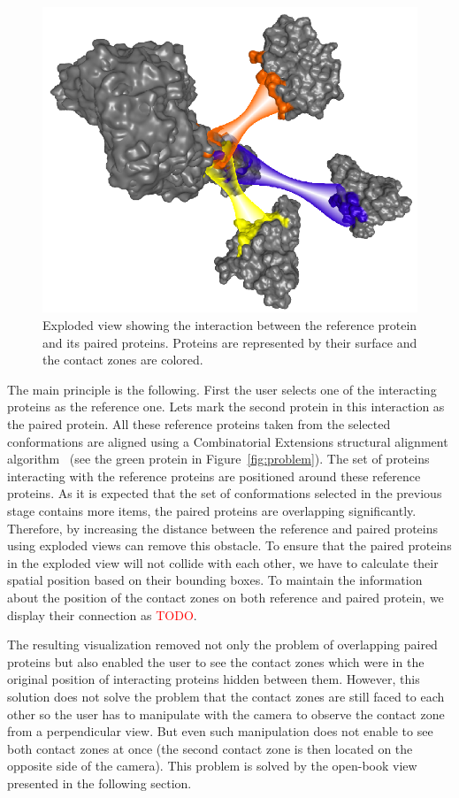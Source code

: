 \documentclass[journal]{vgtc}                %
\begin{document}
\begin{figure}[bt]
  \centering
  \includegraphics[width=1.0\columnwidth]{exploded.png}
  \caption{Exploded view showing the interaction between the reference protein and its paired proteins. Proteins are represented by their surface and the contact zones are colored.}
  \label{fig:exploded}
\end{figure}

The main principle is the following.
First the user selects one of the interacting proteins as the reference one.
Lets mark the second protein in this interaction as the paired protein.
All these reference proteins taken from the selected conformations are aligned using a Combinatorial Extensions structural alignment algorithm~\cite{Shindyalov1998} (see the green protein in Figure~\ref{fig:problem}).
The set of proteins interacting with the reference proteins are positioned around these reference proteins.
As it is expected that the set of conformations selected in the previous stage contains more items, the paired proteins are overlapping significantly.
Therefore, by increasing the distance between the reference and paired proteins using exploded views can remove this obstacle.
To ensure that the paired proteins in the exploded view will not collide with each other, we have to calculate their spatial position based on their bounding boxes.
To maintain the information about the position of the contact zones on both reference and paired protein, we display their connection as \textcolor{red}{TODO}.

The resulting visualization removed not only the problem of overlapping paired proteins but also enabled the user to see the contact zones which were in the original position of interacting proteins hidden between them.
However, this solution does not solve the problem that the contact zones are still faced to each other so the user has to manipulate with the camera to observe the contact zone from a perpendicular view. 
But even such manipulation does not enable to see both contact zones at once (the second contact zone is then located on the opposite side of the camera).
This problem is solved by the open-book view presented in the following section.
\end{document}
